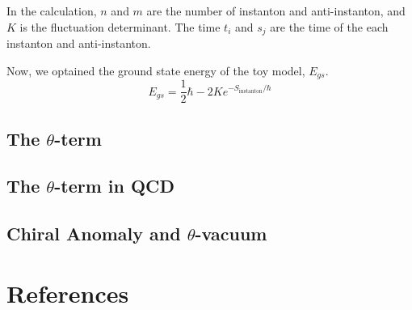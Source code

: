 \documentclass{article}
\begin{document}
In the calculation, $n$ and $m$ are the number of instanton and anti-instanton, and $K$ is the fluctuation determinant.
The time $t_i$ and $s_j$ are the time of the each instanton and anti-instanton.

Now, we optained the ground state energy of the toy model, $E_{gs}$.
\[
    E_{gs} = \frac{1}{2}\hbar-2K e^{-S_{\text{instanton}}/\hbar}
\]
\subsection{The $\theta$-term}


\subsection{The $\theta$-term in QCD}


\subsection{Chiral Anomaly and $\theta$-vacuum}

\section{References}
\end{document}
